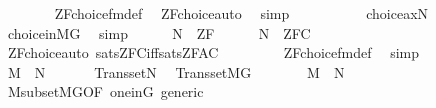 \begin{isabellebody}
\ \ \ \ \ \ \isamarkupfalse%
\ ZF{\isacharunderscore}{\kern0pt}choice{\isacharunderscore}{\kern0pt}fm{\isacharunderscore}{\kern0pt}def\ \isamarkupfalse%
\ ZF{\isacharunderscore}{\kern0pt}choice{\isacharunderscore}{\kern0pt}auto\ \isamarkupfalse%
\ simp\isanewline
\ \ \ \ \isamarkupfalse%
\isanewline
\ \ \ \ \isamarkupfalse%
\ {\isachardoublequoteopen}choice{\isacharunderscore}{\kern0pt}ax{\isacharparenleft}{\kern0pt}{\isacharhash}{\kern0pt}{\isacharhash}{\kern0pt}{\isacharquery}{\kern0pt}N{\isacharparenright}{\kern0pt}{\isachardoublequoteclose}\ \isamarkupfalse%
\ choice{\isacharunderscore}{\kern0pt}in{\isacharunderscore}{\kern0pt}MG\ \isamarkupfalse%
\ simp\isanewline
\ \ \ \ \isamarkupfalse%
\ {\isacartoucheopen}{\isacharquery}{\kern0pt}N\ {\isasymTurnstile}\ ZF{\isacartoucheclose}\isanewline
\ \ \ \ \isamarkupfalse%
\ {\isachardoublequoteopen}{\isacharquery}{\kern0pt}N\ {\isasymTurnstile}\ ZFC{\isachardoublequoteclose}\isanewline
\ \ \ \ \ \ \isamarkupfalse%
\ ZF{\isacharunderscore}{\kern0pt}choice{\isacharunderscore}{\kern0pt}auto\ sats{\isacharunderscore}{\kern0pt}ZFC{\isacharunderscore}{\kern0pt}iff{\isacharunderscore}{\kern0pt}sats{\isacharunderscore}{\kern0pt}ZF{\isacharunderscore}{\kern0pt}AC\ \isanewline
\ \ \ \ \ \ \isamarkupfalse%
\ ZF{\isacharunderscore}{\kern0pt}choice{\isacharunderscore}{\kern0pt}fm{\isacharunderscore}{\kern0pt}def\ \isamarkupfalse%
\ simp\isanewline
\ \ \isamarkupfalse%
\isanewline
\ \ \isamarkupfalse%
\isanewline
\ \ \isamarkupfalse%
\ {\isacartoucheopen}M\ {\isasymnoteq}\ {\isacharquery}{\kern0pt}N{\isacartoucheclose}\isanewline
\ \ \isamarkupfalse%
\isanewline
\ \ \isamarkupfalse%
\ {\isachardoublequoteopen}Transset{\isacharparenleft}{\kern0pt}{\isacharquery}{\kern0pt}N{\isacharparenright}{\kern0pt}{\isachardoublequoteclose}\ \isamarkupfalse%
\ Transset{\isacharunderscore}{\kern0pt}MG\ \isacommand{{\isachardot}{\kern0pt}}\isamarkupfalse%
\isanewline
\ \ \isamarkupfalse%
\isanewline
\ \ \isamarkupfalse%
\ {\isachardoublequoteopen}M\ {\isasymsubseteq}\ {\isacharquery}{\kern0pt}N{\isachardoublequoteclose}\ \isamarkupfalse%
\ M{\isacharunderscore}{\kern0pt}subset{\isacharunderscore}{\kern0pt}MG{\isacharbrackleft}{\kern0pt}OF\ one{\isacharunderscore}{\kern0pt}in{\isacharunderscore}{\kern0pt}G{\isacharbrackright}{\kern0pt}\ generic\ \isamarkupfalse%

\end{isabellebody}

